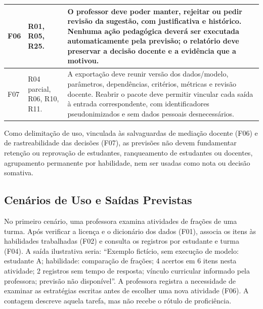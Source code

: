 \begin{longtable}{|p{1cm}|p{2.8cm}|>{\raggedright\arraybackslash}p{\dimexpr\textwidth-3.8cm-6\tabcolsep-4\arrayrulewidth\relax}|}
F06 & R01, R05, R25. & O professor deve poder manter, rejeitar ou pedir revisão da sugestão, com justificativa e histórico. Nenhuma ação pedagógica deverá ser executada automaticamente pela previsão; o relatório deve preservar a decisão docente e a evidência que a motivou. \\\hline
F07 & R04 parcial, R06, R10, R11. & A exportação deve reunir versão dos dados/modelo, parâmetros, dependências, critérios, métricas e revisão docente. Reabrir o pacote deve permitir vincular cada saída à entrada correspondente, com identificadores pseudonimizados e sem dados pessoais desnecessários. \\\hline
\end{longtable}
\endgroup

Como delimitação de uso, vinculada às salvaguardas de mediação docente (F06) e de rastreabilidade das decisões (F07), as previsões não devem fundamentar retenção ou reprovação de estudantes, ranqueamento de estudantes ou docentes, agrupamento permanente por habilidade, nem ser usadas como nota ou decisão somativa.

\subsection{Cenários de Uso e Saídas Previstas}
\label{sec:cenarios-uso}

No primeiro cenário, uma professora examina atividades de frações de uma turma. Após verificar a licença e o dicionário dos dados (F01), associa os itens às habilidades trabalhadas (F02) e consulta os registros por estudante e turma (F04). A saída ilustrativa seria: ``Exemplo fictício, sem execução de modelo: estudante A; habilidade: comparação de frações; 4 acertos em 6 itens nesta atividade; 2 registros sem tempo de resposta; vínculo curricular informado pela professora; previsão não disponível''. A professora registra a necessidade de examinar as estratégias escritas antes de escolher uma nova atividade (F06). A contagem descreve aquela tarefa, mas não recebe o rótulo de proficiência.

